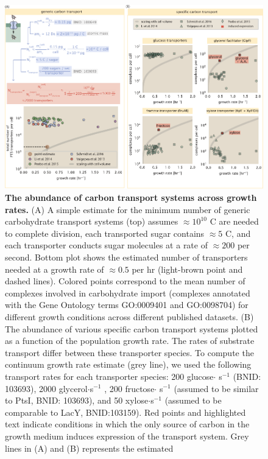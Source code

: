 \begin{figure}
    \begin{fullwidth}
    \includegraphics{main_figs/fig2_carbon_transport.pdf}
    \caption{\textbf{The abundance of carbon transport systems across growth
    rates.} (A) A simple estimate for the minimum number of generic carbohydrate
    transport systems (top) assumes $\approx 10^{10}$ C are needed to complete
    division, each transported sugar contains $\approx 5$ C, and each
    transporter conducts sugar molecules at a rate of $\approx 200$ per second.
    Bottom plot shows the estimated number of transporters needed at a growth
    rate of $\approx 0.5 $ per hr (light-brown point and dashed lines).  Colored
    points correspond to the mean number of complexes involved in carbohydrate
    import (complexes annotated with the Gene Ontology terms GO:0009401 and
    GO:0098704) for different growth conditions across different published
    datasets. (B) The abundance of various specific carbon transport systems
    plotted as a function of the population growth rate. The rates of substrate
    transport differ between these transporter species. To compute the continuum
    growth rate estimate (grey line), we used the following transport rates for
    each transporter species: 200
    glucose$\cdot$ s$^{-1}$ (BNID: 103693),  2000 glycerol$\cdot$s$^{-1}$
    \citep{lu2003}, 200 fructose$\cdot$ s$^{-1}$ (assumed to be similar to PtsI,
    BNID: 103693), and 50 xylose$\cdot$s$^{-1}$ (assumed to be comparable to
    LacY, BNID:103159). Red points and highlighted text indicate conditions in
    which the only source of carbon in the growth medium induces expression of
    the transport system. Grey lines in (A) and (B) represents the estimated
}
\end{fullwidth}
\end{figure}
